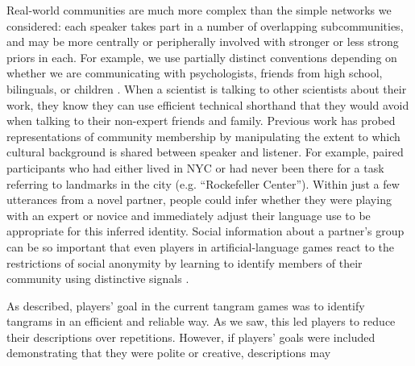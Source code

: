 Real-world communities are much more complex than the simple networks we considered: each speaker takes part in a number of overlapping subcommunities, and may be more centrally or peripherally involved with stronger or less strong priors in each. 
For example, we use partially distinct conventions depending on whether we are communicating with psychologists, friends from high school, bilinguals, or children \cite{auer_code-switching_2013}.
When a scientist is talking to other scientists about their work, they know they can use efficient technical shorthand that they would avoid when talking to their non-expert friends and family. 
Previous work has probed representations of community membership by manipulating the extent to which cultural background is shared between speaker and listener.
For example,  paired participants who had either lived in NYC or had never been there for a task referring to landmarks in the city (e.g. ``Rockefeller Center''). 
Within just a few utterances from a novel partner, people could infer whether they were playing with an expert or novice and immediately adjust their language use to be appropriate for this inferred identity. 
Social information about a partner’s group can be so important that even players in artificial-language games react to the restrictions of social anonymity by learning to identify members of their community using distinctive signals \cite{roberts_experimental_2010}.

As described, players' goal in the current tangram games was to identify tangrams in an efficient and reliable way. As we saw, this led players to reduce their descriptions over repetitions. However, if players' goals were included demonstrating that they were polite or creative, descriptions may

